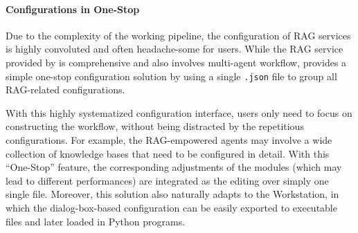 
\paragraph{Configurations in One-Stop}
Due to the complexity of the working pipeline, the configuration of RAG services is highly convoluted and often headache-some for users. While the RAG service provided by \ours is comprehensive and also involves multi-agent workflow, \ours provides a simple one-stop configuration solution by using a single \texttt{.json} file to group all RAG-related configurations. 

With this highly systematized configuration interface, users only need to focus on constructing the workflow, without being distracted by the repetitious configurations. For example, the RAG-empowered agents may involve a wide collection of knowledge bases that need to be configured in detail. With this ``One-Stop'' feature, the corresponding adjustments of the modules (which may lead to different performances) are integrated as the editing over simply one single file. Moreover, this solution also naturally adapts to the \ours Workstation, in which the dialog-box-based configuration can be easily exported to executable files and later loaded in Python programs.

